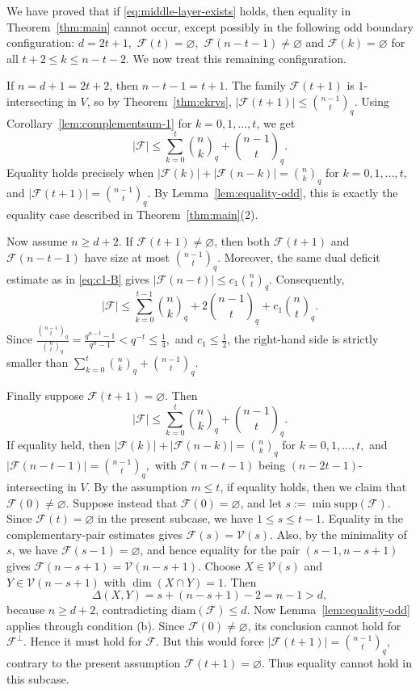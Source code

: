 \documentclass[11pt]{article}
\theoremstyle{definition}
\newcommand{\qbinom}[2]{\genfrac{(}{)}{0pt}{}{#1}{#2}_q}
\newcommand{\diam}{\mathrm{diam}}
\newcommand{\supp}{\mathrm{supp}}
\begin{document}
We have proved that if \eqref{eq:middle-layer-exists} holds, then equality in Theorem~\ref{thm:main} cannot occur, except possibly in the following odd boundary configuration:
\(
d=2t+1,\)
\(\mathcal F(t)=\varnothing,\)
\(
\mathcal F(n-t-1)\neq\varnothing\)
and
\(
\mathcal F(k)=\varnothing\)
for all \(t+2\le k\le n-t-2.\)
We now treat this remaining configuration.

If $n=d+1=2t+2$, then $n-t-1=t+1$. 
The family $\mathcal F(t+1)$ is $1$-intersecting in $V$, so by Theorem~\ref{thm:ekrvs},
\(
|\mathcal F(t+1)|\le \qbinom{n-1}{t}.
\)
Using Corollary~\ref{lem:complementsum-1} for $k=0,1,\ldots,t$, we get
\[
|\mathcal F|
\le
\sum_{k=0}^{t}\qbinom{n}{k}
+
\qbinom{n-1}{t}.
\]
Equality holds precisely when
\(
|\mathcal F(k)|+|\mathcal F(n-k)|=\qbinom{n}{k}
\)
for \(k=0,1,\ldots,t,\)
and
\(
|\mathcal F(t+1)|=\qbinom{n-1}{t}.
\)
By Lemma~\ref{lem:equality-odd}, this is exactly the equality case described in Theorem~\ref{thm:main}(2).

Now assume $n\ge d+2$. 
If $\mathcal F(t+1)\neq\varnothing$, then both $\mathcal F(t+1)$ and $\mathcal F(n-t-1)$ have size at most $\qbinom{n-1}{t}$. 
Moreover, the same dual deficit estimate as in \eqref{eq:c1-B} gives
\(
|\mathcal F(n-t)|\le c_1\qbinom{n}{t}.
\)
Consequently,
\[
|\mathcal F|
\le
\sum_{k=0}^{t-1}\qbinom{n}{k}
+
2\qbinom{n-1}{t}
+
c_1\qbinom{n}{t}.
\]
Since
\(
\frac{\qbinom{n-1}{t}}{\qbinom{n}{t}}
=
\frac{q^{n-t}-1}{q^n-1}
<
q^{-t}
\le \frac14,
\)
and $c_1\le \frac12$, the right-hand side is strictly smaller than
\(
\sum_{k=0}^{t}\qbinom{n}{k}
+
\qbinom{n-1}{t}.
\)

Finally suppose $\mathcal F(t+1)=\varnothing$. 
Then
\[
|\mathcal F|
\le
\sum_{k=0}^{t}\qbinom{n}{k}
+
\qbinom{n-1}{t}.
\]
If equality held, then
\(
|\mathcal F(k)|+|\mathcal F(n-k)|=\qbinom{n}{k}\)
for \(k=0,1,\ldots,t,\)
and
\(
|\mathcal F(n-t-1)|=\qbinom{n-1}{t},
\)
with $\mathcal F(n-t-1)$ being $(n-2t-1)$-intersecting in $V$. 
By the assumption $m\le t$, if equality holds, then we claim that $\mathcal{F}(0) \neq \varnothing$. 
Suppose instead that \(\mathcal F(0)=\varnothing\), and let
\(s:=\min\supp(\mathcal F)\). Since \(\mathcal F(t)=\varnothing\) in the present subcase, we have
\(
1 \le s \le t-1.
\) 
Equality in the complementary-pair estimates gives
\(\mathcal F(s)=\mathcal V(s)\). Also, by the minimality of \(s\), we have
\(\mathcal F(s-1)=\varnothing\), and hence equality for the pair
\((s-1,n-s+1)\) gives
\(
\mathcal F(n-s+1)=\mathcal V(n-s+1).
\)
Choose \(X\in\mathcal V(s)\) and \(Y\in\mathcal V(n-s+1)\) with
\(\dim(X\cap Y)=1\). Then
\[
\Delta(X,Y)=s+(n-s+1)-2=n-1>d,
\]
because \(n\ge d+2\), contradicting \(\diam(\mathcal F)\le d\). Now Lemma~\ref{lem:equality-odd} applies through condition (b). Since
\(\mathcal F(0)\neq\varnothing\), its conclusion cannot hold for
\(\mathcal F^\perp\). Hence it must hold for \(\mathcal F\). But this would
force
\(
|\mathcal F(t+1)|=\qbinom{n-1}{t},
\)
contrary to the present assumption \(\mathcal F(t+1)=\varnothing\).
Thus equality cannot hold in this subcase.
\end{document}
